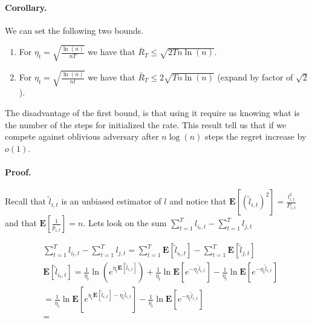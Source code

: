 \documentclass{article}
\newcommand{\expp}[1]{ \mathbf{E} \left[ {#1} \right]}
\begin{document}
\begin{multicols*}{2}
 \paragraph{Corollary.} We can set the following two bounds.\begin{enumerate}
   \item For $\eta_{t} = \sqrt{\frac{\ln(n)}{ nT} }$ we have that $\bar{R}_{T} \le \sqrt{2Tn\ln(n)}$.  
   \item  For $\eta_{t} = \sqrt{\frac{\ln(n)}{ nt} }$ we have that  $\bar{R}_{T} \le 2 \sqrt{Tn\ln(n)}$ (expand by factor of $\sqrt{2}$).
 \end{enumerate} 
 The disadvantage of the first bound, is that using it require us knowing what is the number of the steps for initialized the rate. This result tell us that if we compete against oblivious adversary after $n\log(n)$ steps the regret increase by $o(1)$. 

 \paragraph{Proof.} Recall that $\tilde{l}_{i,t}$ is an unbiased estimator of $l$ and notice that $\expp{\left( \tilde{l}_{i,t} \right)^2} = \frac{l_{i,t}^{2}}{P_{i,t}}$ and that $\expp{\frac{1}{p_{i,t}}} = n$. Lets look on the sum $\sum^{T}_{t=1}{l_{i_{t},t}} - \sum_{t=1}^{T}{l_{j,t}}$

 \begin{equation*}
   \begin{split}
 & \sum^{T}_{t=1}{l_{i_{t},t}} - \sum_{t=1}^{T}{l_{j,t}} =\sum^{T}_{t=1}{\expp{ \tilde{l}_{i_{t},t}}} - \sum_{t=1}^{T}{\expp{\tilde{l}_{j,t} }} \\
 & \expp{ \tilde{l}_{i_{t},t}} = \frac{1}{\eta_{t}}\ln\left( e^{\eta_{t}\expp{\tilde{l}_{i,t}}} \right) + \frac{1}{\eta_{t}}\ln\expp{e^{-\eta_{t}\tilde{l}_{i,t}}}-\frac{1}{\eta_{t}}\ln\expp{e^{-\eta_{t}\tilde{l}_{i,t}}} \\ 
& =\frac{1}{\eta_{t}}\ln\expp{e^{\eta_{t}\expp{\tilde{l}_{i,t}}-\eta_{t}\tilde{l}_{i,t}}} -\frac{1}{\eta_{t}}\ln\expp{e^{-\eta_{t}\tilde{l}_{i,t}}} \\ 
& =  
 \end{split}
 \end{equation*}
\end{multicols*}
  \printbibliography 
\end{document}
